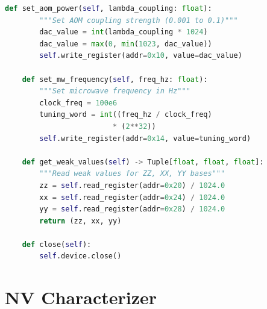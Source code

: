 \documentclass[11pt,a4paper,openany]{book}
\begin{document}
\begin{lstlisting}[language=Python,caption={FPGADevice class --- serial interface to Zedboard}]
    def set_aom_power(self, lambda_coupling: float):
        """Set AOM coupling strength (0.001 to 0.1)"""
        dac_value = int(lambda_coupling * 1024)
        dac_value = max(0, min(1023, dac_value))
        self.write_register(addr=0x10, value=dac_value)

    def set_mw_frequency(self, freq_hz: float):
        """Set microwave frequency in Hz"""
        clock_freq = 100e6
        tuning_word = int((freq_hz / clock_freq)
                         * (2**32))
        self.write_register(addr=0x14, value=tuning_word)

    def get_weak_values(self) -> Tuple[float, float, float]:
        """Read weak values for ZZ, XX, YY bases"""
        zz = self.read_register(addr=0x20) / 1024.0
        xx = self.read_register(addr=0x24) / 1024.0
        yy = self.read_register(addr=0x28) / 1024.0
        return (zz, xx, yy)

    def close(self):
        self.device.close()
\end{lstlisting}

\section{NV Characterizer}
\end{document}
